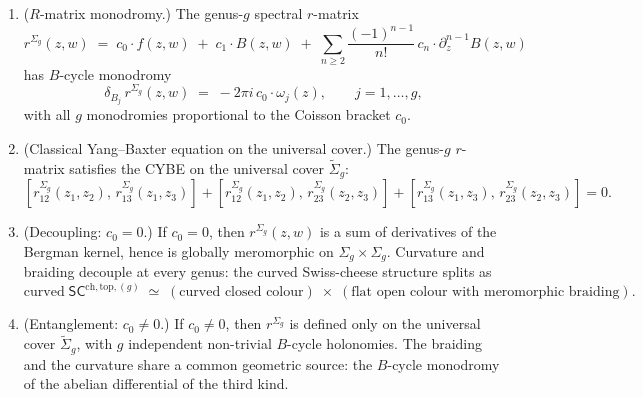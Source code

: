 \begin{theorem}
\begin{enumerate}[label=\textup{(\alph*)}]
\item \label{item:genus-g-r-monodromy}
\textup{($R$-matrix monodromy.)}
The genus-$g$ spectral $r$-matrix
\begin{equation}
\label{eq:genus-g-r-matrix}
r^{\Sigma_g}(z,w)
\;=\;
c_0 \cdot f(z,w)
\;+\;
c_1 \cdot B(z,w)
\;+\;
\sum_{n \ge 2}
 \frac{(-1)^{n-1}}{n!}\,
 c_n \cdot \partial_z^{n-1} B(z,w)
\end{equation}
has $B$-cycle monodromy
\begin{equation}
\label{eq:genus-g-r-monodromy}
\delta_{B_j}\, r^{\Sigma_g}(z,w)
\;=\;
-2\pi i\, c_0 \cdot \omega_j(z),
\qquad j = 1, \dotsc, g,
\end{equation}
with all $g$ monodromies proportional to the Coisson bracket $c_0$.

\item \label{item:genus-g-CYBE}
\textup{(Classical Yang--Baxter equation on the universal cover.)}
The genus-$g$ $r$-matrix satisfies the CYBE on the universal
cover $\widetilde{\Sigma}_g$:
\[
[r_{12}^{\Sigma_g}(z_1,z_2),\, r_{13}^{\Sigma_g}(z_1,z_3)]
+ [r_{12}^{\Sigma_g}(z_1,z_2),\, r_{23}^{\Sigma_g}(z_2,z_3)]
+ [r_{13}^{\Sigma_g}(z_1,z_3),\, r_{23}^{\Sigma_g}(z_2,z_3)]
= 0.
\]

\item \label{item:genus-g-decoupling}
\textup{(Decoupling: $c_0 = 0$.)}
If $c_0 = 0$, then $r^{\Sigma_g}(z,w)$ is a sum
of derivatives of the Bergman kernel, hence is globally
meromorphic on $\Sigma_g \times \Sigma_g$. Curvature and
braiding decouple at every genus: the curved
Swiss-cheese structure splits as
\[
\text{curved}\;\mathsf{SC}^{\mathrm{ch,top},(g)}
\;\simeq\;
(\text{curved closed colour})
\;\times\;
(\text{flat open colour with meromorphic braiding}).
\]

\item \label{item:genus-g-entanglement}
\textup{(Entanglement: $c_0 \ne 0$.)}
If $c_0 \ne 0$, then $r^{\Sigma_g}$ is defined only on the universal
cover $\widetilde{\Sigma}_g$, with $g$ independent non-trivial
$B$-cycle holonomies. The braiding and the curvature share a
common geometric source: the $B$-cycle monodromy of the
abelian differential of the third kind.
\end{enumerate}
\end{theorem}

